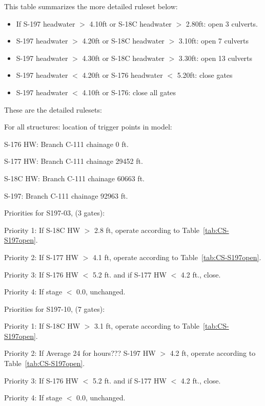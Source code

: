 This table summarizes the more detailed ruleset below:
\begin{itemize}
\item If S-197 headwater $>$ 4.10ft or S-18C headwater $>$ 2.80ft: open 3 culverts.
\item S-197 headwater $>$ 4.20ft or S-18C headwater $>$ 3.10ft: open 7 culverts
\item S-197 headwater $>$ 4.30ft or S-18C headwater $>$ 3.30ft: open 13 culverts
\item S-197 headwater $<$ 4.20ft or S-176 headwater $<$ 5.20ft: close gates
\item S-197 headwater $<$ 4.10ft or S-176: close all gates
\end{itemize}

These are the detailed rulesets:

For all structures: location of trigger points in model:
\begin{packed_items}
\item S-176 HW: Branch C-111 chainage 0 ft.
\item S-177 HW: Branch C-111 chainage 29452 ft.
\item S-18C HW: Branch C-111 chainage 60663 ft.
\item S-197: Branch C-111 chainage 92963 ft.
\end{packed_items}



Priorities for S197-03, (3 gates):
\begin{packed_items}
\item Priority 1: If S-18C HW $>$ 2.8 ft, operate according to Table~\ref{tab:CS-S197open}.
\item Priority 2: If S-177 HW $>$ 4.1 ft, operate according to Table~\ref{tab:CS-S197open}.
\item Priority 3: If S-176 HW $<$ 5.2 ft. and if S-177 HW $<$ 4.2 ft., close.
\item Priority 4: If stage $<$ 0.0, unchanged.
\end{packed_items}


Priorities for S197-10, (7 gates):
\begin{packed_items}
\item Priority 1: If S-18C HW $>$ 3.1 ft, operate according to Table~\ref{tab:CS-S197open}.
\item Priority 2: If \textcolor[rgb]{1.00,0.00,0.00}{Average 24 for hours??? S-197 HW} $>$ 4.2 ft, operate according to Table~\ref{tab:CS-S197open}.
\item Priority 3: If S-176 HW $<$ 5.2 ft. and if S-177 HW $<$ 4.2 ft., close.
\item Priority 4: If stage $<$ 0.0, unchanged.
\end{packed_items}


